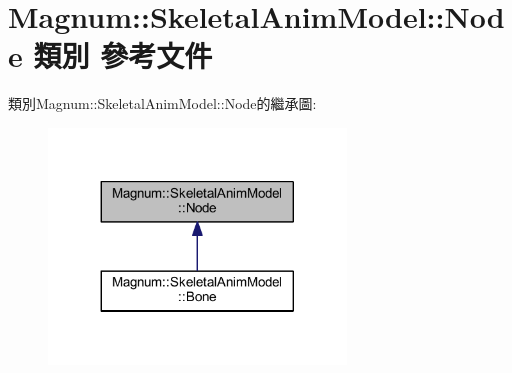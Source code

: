 \hypertarget{class_magnum_1_1_skeletal_anim_model_1_1_node}{}\section{Magnum\+:\+:Skeletal\+Anim\+Model\+:\+:Node 類別 參考文件}
\label{class_magnum_1_1_skeletal_anim_model_1_1_node}


類別\+Magnum\+:\+:Skeletal\+Anim\+Model\+:\+:Node的繼承圖\+:\nopagebreak
\begin{figure}[H]
\begin{center}
\leavevmode
\includegraphics[width=224pt]{class_magnum_1_1_skeletal_anim_model_1_1_node__inherit__graph}
\end{center}
\end{figure}
